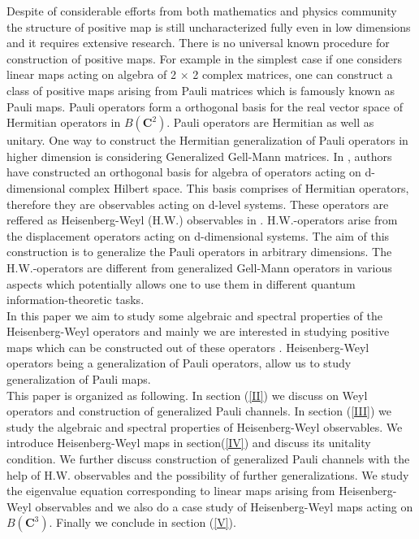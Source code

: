 \documentclass[12pt]{amsart}
\numberwithin{equation}{section}
\begin{document}
Despite of considerable efforts from both mathematics and physics community \cite{S63,C75,WORONO76,Tang86,OSAKA1991,Osaka93,Ha98,Ha02,K03,Ha03,M07,ZC13,C14,LACRS16,MR17} the structure of positive map is still uncharacterized fully even in low dimensions and it requires extensive research. 
There is no universal known procedure for construction of positive maps. 
For example in the simplest case if one considers linear maps acting on algebra of 2 $\times$ 2 complex matrices, one can construct a class of positive maps arising from Pauli matrices which is famously known as Pauli maps. Pauli operators form a orthogonal basis for the real vector space of Hermitian operators in $B\left(\mathbf{C}^2\right) $. Pauli operators are Hermitian as well as unitary. One way to construct the Hermitian generalization of Pauli operators in higher dimension is considering Generalized Gell-Mann matrices. In \cite{AEHK16}, authors have  constructed an orthogonal basis for algebra of operators acting on d-dimensional complex Hilbert space. This basis comprises of Hermitian operators, therefore 
 they are observables acting on d-level systems. These operators are reffered as Heisenberg-Weyl (H.W.) observables in \cite{AEHK16}. H.W.-operators arise from the displacement operators acting on d-dimensional systems. The aim of this construction is to generalize the Pauli operators in arbitrary dimensions. The H.W.-operators are different from generalized Gell-Mann operators in various aspects which potentially allows one to use them in different quantum information-theoretic tasks.\\


In this paper we aim to study some algebraic and spectral properties of the Heisenberg-Weyl operators  and mainly we are interested in studying positive maps which can be constructed out of these operators . Heisenberg-Weyl operators being a generalization of Pauli operators, allow us to study generalization of Pauli maps.  \\




This paper is organized as following. In section (\ref{II}) we discuss on Weyl operators and construction of generalized Pauli channels. In section (\ref{III}) we study the algebraic and spectral properties of Heisenberg-Weyl observables. We introduce Heisenberg-Weyl maps in section(\ref{IV}) and discuss its unitality condition. We further discuss construction of generalized Pauli channels with the help of H.W. observables and the possibility of further generalizations. We study the eigenvalue equation corresponding to linear maps arising from  Heisenberg-Weyl observables and  we also do a case study of Heisenberg-Weyl maps acting on $B\left(\mathbf{C}^3\right)$. Finally we conclude in section (\ref{V}).
\end{document}
